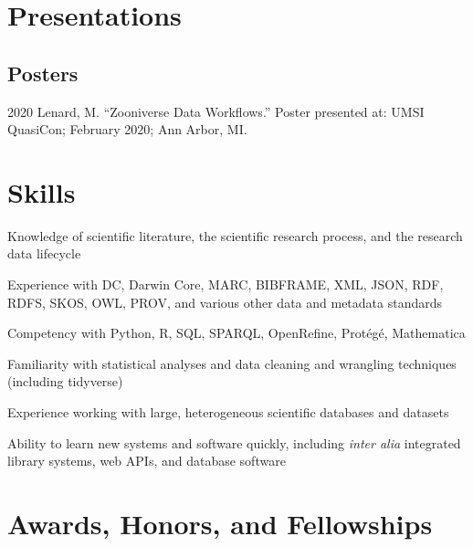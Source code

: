 \documentclass[12pt,letterpaper]{report}
\newcommand{\listitemspace}{0.25em}
\renewenvironment{itemize}
{\begin{list}{}{\setlength{\leftmargin}{0em}
            \setlength{\parskip}{0em}
            \setlength{\itemsep}{\listitemspace}
            \setlength{\parsep}{\listitemspace}}}
{\end{list}}
\begin{document}
\section*{Presentations}
    
\subsection*{Posters}
    
\begin{tablist}
    
	\item[2020] \tab Lenard, M. \enquote{Zooniverse Data Workflows.} Poster presented at: UMSI QuasiCon; February 2020; Ann Arbor, MI.

\end{tablist}



\section*{Skills}

\begin{itemize}

	\item Knowledge of scientific literature, the scientific research process, and the research data lifecycle
        
	\item Experience with DC, Darwin Core, MARC, BIBFRAME, XML, JSON, RDF, RDFS, SKOS, OWL, PROV, and various other data and metadata standards
        
	\item Competency with Python, R, SQL, SPARQL, OpenRefine, Protégé, Mathematica
        
	\item Familiarity with statistical analyses and data cleaning and wrangling techniques (including tidyverse)

	\item Experience working with large, heterogeneous scientific databases and datasets

	\item Ability to learn new systems and software quickly, including \textit{inter alia} integrated library systems, web APIs, and database software
        
\end{itemize}



\section*{Awards, Honors, and Fellowships}
\end{document}
